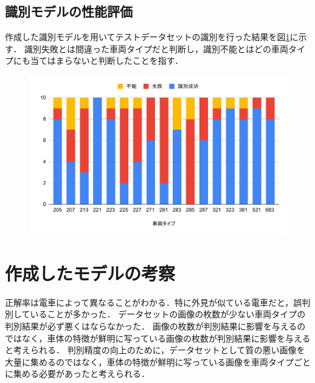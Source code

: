 \begin{multicols*}{2}
\subsection{識別モデルの性能評価}
作成した識別モデルを用いてテストデータセットの識別を行った結果を図\ref{fig:chartdet}に示す．
識別失敗とは間違った車両タイプだと判断し，識別不能とはどの車両タイプにも当てはまらないと判断したことを指す．
\begin{figure}
	\centering
	\includegraphics[width=\linewidth]{obj/chartDET.pdf}
	\label{fig:chartdet}
\end{figure}





\section{作成したモデルの考察}
正解率は電車によって異なることがわかる．特に外見が似ている電車だと，誤判別していることが多かった．
データセットの画像の枚数が少ない車両タイプの判別結果が必ず悪くはならなかった．
画像の枚数が判別結果に影響を与えるのではなく，車体の特徴が鮮明に写っている画像の枚数が判別結果に影響を与えると考えられる．
判別精度の向上のために，データセットとして質の悪い画像を大量に集めるのではなく，車体の特徴が鮮明に写っている画像を車両タイプごとに集める必要があったと考えられる．




\end{multicols*}
